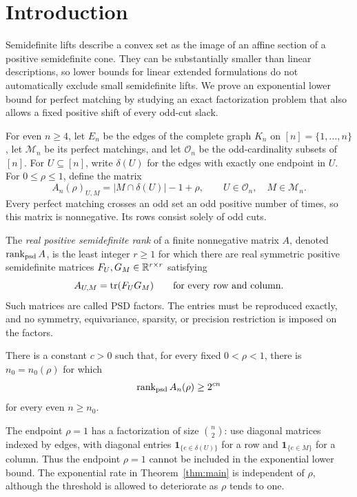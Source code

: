 \section{Introduction}
\label{sec:introduction}

Semidefinite lifts describe a convex set as the image of an affine
section of a positive semidefinite cone.  They can be substantially
smaller than linear descriptions, so lower bounds for linear extended
formulations do not automatically exclude small semidefinite lifts.
We prove an exponential lower bound for perfect matching by studying
an exact factorization problem that also allows a fixed positive
shift of every odd-cut slack.

For even $n\ge4$, let $E_n$ be the edges of the complete graph $K_n$
on $[n]=\{1,\ldots,n\}$, let $\mathcal M_n$ be its perfect matchings,
and let $\mathcal O_n$ be the odd-cardinality subsets of $[n]$.
For $U\subseteq[n]$, write $\delta(U)$ for the edges with exactly
one endpoint in $U$.  For $0\le\rho\le1$, define the matrix
\begin{equation}\label{eq:main-matrix}
 A_n(\rho)_{U,M}=|M\cap\delta(U)|-1+\rho,
 \qquad U\in\mathcal O_n,\quad M\in\mathcal M_n.
\end{equation}
Every perfect matching crosses an odd set an odd positive number
of times, so this matrix is nonnegative.  Its rows consist solely
of odd cuts.

The \emph{real positive semidefinite rank} of a finite nonnegative
matrix $A$, denoted $\operatorname{rank_{psd}} A$, is the least integer $r\ge1$ for
which there are real symmetric positive semidefinite matrices
$F_U,G_M\in\mathbb R^{r\times r}$ satisfying
\[
 A_{U,M}=\operatorname{tr}(F_UG_M)
 \qquad\text{for every row and column}.
\]
Such matrices are called PSD factors.  The entries must be reproduced
exactly, and no symmetry, equivariance, sparsity, or precision
restriction is imposed on the factors.

\begin{theorem}\label{thm:main}
There is a constant $c>0$ such that, for every fixed $0<\rho<1$,
there is $n_0=n_0(\rho)$ for which
\[
 \operatorname{rank_{psd}} A_n(\rho)\ge2^{cn}
\]
for every even $n\ge n_0$.
\end{theorem}

The endpoint $\rho=1$ has a factorization of size $\binom n2$:
use diagonal matrices indexed by edges, with diagonal entries
$\mathbf1_{\{e\in\delta(U)\}}$ for a row and
$\mathbf1_{\{e\in M\}}$ for a column.  Thus the endpoint $\rho=1$
cannot be included in the exponential lower bound.
The exponential rate in Theorem~\ref{thm:main} is independent of
$\rho$, although the threshold is allowed to deteriorate as
$\rho$ tends to one.


